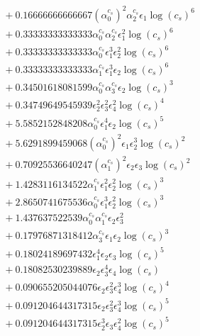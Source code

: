 \documentclass[10pt]{article}
\begin{document}
\begin{align*}
&{}  + 0.16666666666667 \left(\alpha_{0}^{c_s}\right)^{2} \alpha_{2}^{c_s} \epsilon_{1} \log{\left(c_{s} \right)}^{6} \\
&{}  + 0.33333333333333 \alpha_{0}^{c_s} \alpha_{2}^{c_s} \epsilon_{1}^{2} \log{\left(c_{s} \right)}^{6} \\
&{}  + 0.33333333333333 \alpha_{0}^{c_s} \epsilon_{1}^{3} \epsilon_{2}^{2} \log{\left(c_{s} \right)}^{6} \\
&{}  + 0.33333333333333 \alpha_{1}^{c_s} \epsilon_{1}^{3} \epsilon_{2} \log{\left(c_{s} \right)}^{6} \\
&{}  + 0.34501618081599 \alpha_{0}^{c_s} \alpha_{3}^{c_s} \epsilon_{2} \log{\left(c_{s} \right)}^{3} \\
&{}  + 0.34749649545939 \epsilon_{2}^{2} \epsilon_{3}^{2} \epsilon_{4}^{2} \log{\left(c_{s} \right)}^{4} \\
&{}  + 5.5852152848208 \alpha_{0}^{c_s} \epsilon_{1}^{4} \epsilon_{2} \log{\left(c_{s} \right)}^{5} \\
&{}  + 5.6291899459068 \left(\alpha_{0}^{c_s}\right)^{2} \epsilon_{1} \epsilon_{2}^{3} \log{\left(c_{s} \right)}^{2} \\
&{}  + 0.70925536640247 \left(\alpha_{1}^{c_s}\right)^{2} \epsilon_{2} \epsilon_{3} \log{\left(c_{s} \right)}^{2} \\
&{}  + 1.4283116134522 \alpha_{1}^{c_s} \epsilon_{1}^{2} \epsilon_{2}^{2} \log{\left(c_{s} \right)}^{3} \\
&{}  + 2.8650741675536 \alpha_{0}^{c_s} \epsilon_{1}^{3} \epsilon_{2}^{2} \log{\left(c_{s} \right)}^{3} \\
&{}  + 1.437637522539 \alpha_{0}^{c_s} \alpha_{1}^{c_s} \epsilon_{2} \epsilon_{3}^{2} \\
&{}  + 0.17976871318412 \alpha_{3}^{c_s} \epsilon_{1} \epsilon_{2} \log{\left(c_{s} \right)}^{3} \\
&{}  + 0.18024189697432 \epsilon_{1}^{4} \epsilon_{2} \epsilon_{3} \log{\left(c_{s} \right)}^{5} \\
&{}  + 0.18082530239889 \epsilon_{2} \epsilon_{3}^{4} \epsilon_{4} \log{\left(c_{s} \right)} \\
&{}  + 0.090655205044076 \epsilon_{2} \epsilon_{3}^{2} \epsilon_{4}^{3} \log{\left(c_{s} \right)}^{4} \\
&{}  + 0.091204644317315 \epsilon_{2} \epsilon_{3}^{2} \epsilon_{4}^{3} \log{\left(c_{s} \right)}^{5} \\
&{}  + 0.091204644317315 \epsilon_{2}^{3} \epsilon_{3} \epsilon_{4}^{2} \log{\left(c_{s} \right)}^{5} \\

\end{align*}
\end{document}
